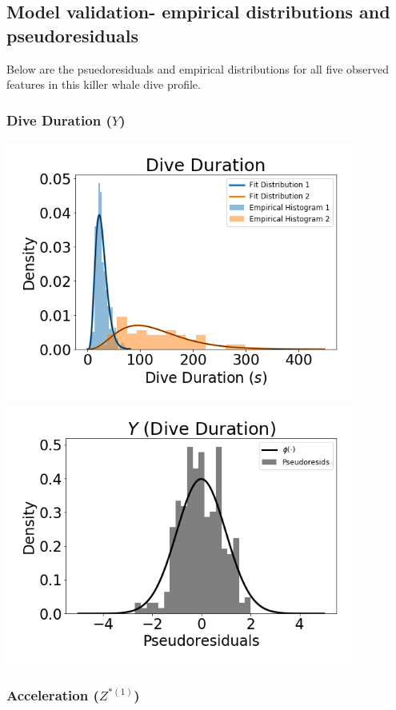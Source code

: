 \documentclass[12pt]{TD-CJS}
\begin{document}
\newpage

\subsection{Model validation- empirical distributions and pseudoresiduals}

Below are the psuedoresiduals and empirical distributions for all five observed features in this killer whale dive profile. 

\subsubsection{Dive Duration ($Y$)}

\includegraphics[width=4.5in]{../Plots/empirical_hist_dive_duration.png}
\includegraphics[width=4.5in]{../Plots/psedoresids_Dive_Duration.png}

\newpage
\subsubsection{Acceleration ($Z^{*(1)}$)}
\end{document}
